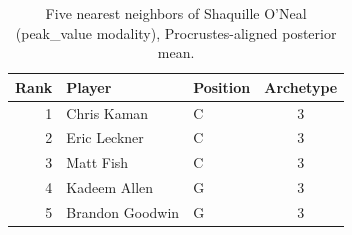 \begin{table}[htbp]
  \centering\small
  \begin{tabular}{rllc}
    \toprule
    Rank & Player & Position & Archetype \\
    \midrule
    1 & Chris Kaman & C & 3 \\
    2 & Eric Leckner & C & 3 \\
    3 & Matt Fish & C & 3 \\
    4 & Kadeem Allen & G & 3 \\
    5 & Brandon Goodwin & G & 3 \\
    \bottomrule
  \end{tabular}
  \caption{Five nearest neighbors of Shaquille O'Neal (peak_value modality), Procrustes-aligned posterior mean.}
  \label{tab:Shaquille_O_Neal_neighbors_peak_value}
\end{table}

